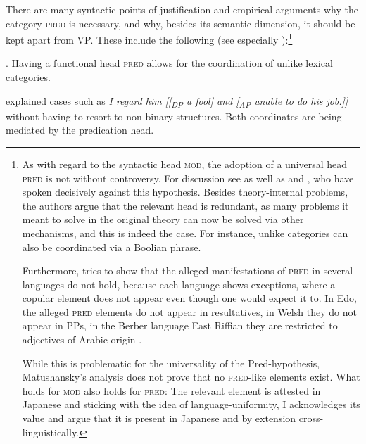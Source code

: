 \documentclass [output=book,colorlinks,citecolor=brown]{langscibook}
\begin{document}
There are many syntactic points of justification and empirical arguments why the category \textsc{pred} is necessary, and why, besides its semantic dimension, it should be kept apart from VP. These include the following (see especially \citealt[598–599]{bowers:1993:predication}):\footnote{As with regard to the syntactic head \textsc{mod}, the adoption of a universal head \textsc{pred} is not without controversy. For discussion see \citet{bowers:1993:predication, bowers:2002:pred, svenonius:1996:pred, dikken:2006:relators, heycock:2013:syntax} as well as \citet{matushansky:2019:against} and \citet{bruening:2020:category}, who have spoken decisively against this hypothesis. Besides theory-internal problems, the authors argue that the relevant head is redundant, as many problems it meant to solve in the original theory can now be solved via other mechanisms, and this is indeed the case. For instance, unlike categories can also be coordinated via a Boolian phrase.

\par

Furthermore, \citet{matushansky:2019:against} tries to show that the alleged manifestations of \textsc{pred} in several languages do not hold, because each language shows exceptions, where a copular element does not appear even though one would expect it to. In Edo, the alleged \textsc{pred} elements do not appear in resultatives, in Welsh they do not appear in PPs, in the Berber language East Riffian they are restricted to adjectives of Arabic origin \citep[sec. 4]{matushansky:2019:against}.

\par

While this is problematic for the universality of the Pred-hypothesis, Matushansky's analysis does not prove that no \textsc{pred}-like elements exist. What holds for \textsc{mod} also holds for \textsc{pred}: The relevant element is attested in Japanese and sticking with the idea of language-uniformity, I acknowledges its value and argue that it is present in Japanese and by extension cross-linguistically.}

\ex. Having a functional head \textsc{pred} allows for the coordination of unlike lexical categories.

\citet{bowers:1993:predication} explained cases such as \textit{I regard him [[\textsubscript{DP} a fool] and [\textsubscript{AP} unable to do his job.]]} without having to resort to non-binary structures. Both coordinates are being mediated by the predication head. %
\end{document}
